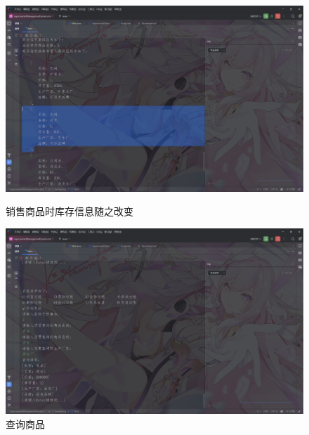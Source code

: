 \documentclass[12pt, a4paper, oneside]{ctexart}
\begin{document}
\begin{figure}[H]
    \begin{minipage}[t]{0.48\textwidth}
        \includegraphics[width=\textwidth]{images/销售商品时库存信息随之改变.png}
        \caption*{销售商品时库存信息随之改变}
    \end{minipage}
    \hfill
    \begin{minipage}[t]{0.48\textwidth}
        \includegraphics[width=\textwidth]{images/查询商品.png}
        \caption*{查询商品}
    \end{minipage}
\end{figure}
\end{document}
